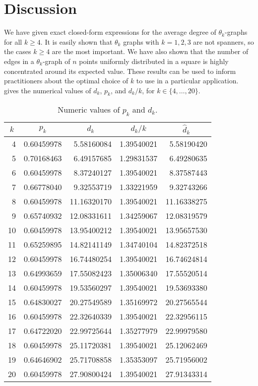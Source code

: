 \documentclass{patmorin}
\begin{document}
\section{Discussion}

We have given exact closed-form expressions for the average degree of
$\theta_k$-graphs for all $k\ge 4$.  It is easily shown that $\theta_k$
graphs with $k=1,2,3$ are not spanners, so the cases $k\ge 4$ are
the most important.  We have also shown that the number of edges in
a $\theta_k$-graph of $n$ points uniformly distributed in a square is
highly concentrated around its expected value.  These results can be
used to inform practitioners about the optimal choice of $k$ to use in
a particular application.   gives the numerical values
of $d_k$, $p_k$, and $d_k/k$, for $k\in\{4,\ldots,20\}$.

\begin{table}
   \begin{center}
     \begin{tabular}{r|r|r|r|r|}
       \multicolumn{1}{c|}{$k$} & \multicolumn{1}{c|}{$p_k$} & \multicolumn{1}{c|}{$d_k$} & \multicolumn{1}{c|}{$d_k/k$} & \multicolumn{1}{c|}{$\hat{d}_k$} \\ \hline
         4 & 0.60459978 &  5.58160084 & 1.39540021 &  5.58190420  \\
         5 & 0.70168463 &  6.49157685 & 1.29831537 &  6.49280635  \\
         6 & 0.60459978 &  8.37240127 & 1.39540021 &  8.37587443  \\
         7 & 0.66778040 &  9.32553719 & 1.33221959 &  9.32743266  \\
         8 & 0.60459978 & 11.16320170 & 1.39540021 & 11.16338275  \\
         9 & 0.65740932 & 12.08331611 & 1.34259067 & 12.08319579  \\
        10 & 0.60459978 & 13.95400212 & 1.39540021 & 13.95657530  \\
        11 & 0.65259895 & 14.82141149 & 1.34740104 & 14.82372518  \\
        12 & 0.60459978 & 16.74480254 & 1.39540021 & 16.74624814  \\
        13 & 0.64993659 & 17.55082423 & 1.35006340 & 17.55520514  \\
        14 & 0.60459978 & 19.53560297 & 1.39540021 & 19.53693380  \\
        15 & 0.64830027 & 20.27549589 & 1.35169972 & 20.27565544  \\
        16 & 0.60459978 & 22.32640339 & 1.39540021 & 22.32956115  \\
        17 & 0.64722020 & 22.99725644 & 1.35277979 & 22.99979580  \\
        18 & 0.60459978 & 25.11720381 & 1.39540021 & 25.12062469  \\
        19 & 0.64646902 & 25.71708858 & 1.35353097 & 25.71956002  \\
        20 & 0.60459978 & 27.90800424 & 1.39540021 & 27.91343314  
     \end{tabular}
   \end{center}
   \caption{Numeric values of $p_k$ and $d_k$.}
\end{table}
\end{document}
